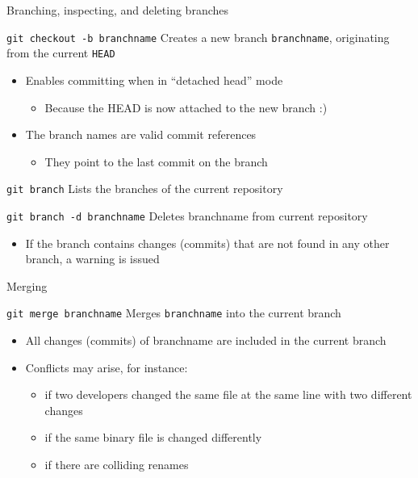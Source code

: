 \documentclass[presentation]{beamer}
\begin{document}
\begin{frame}{Branching, inspecting, and deleting branches}
    \begin{block}{\texttt{git checkout -b branchname}}
        Creates a new branch \texttt{branchname}, originating from the current \texttt{HEAD}
        \begin{itemize}
            \item Enables committing when in ``detached head'' mode
            \begin{itemize}
                \item Because the HEAD is now attached to the new branch :)
            \end{itemize}
            \item The branch names are valid commit references
            \begin{itemize}
                \item They point to the last commit on the branch
            \end{itemize}
        \end{itemize}
    \end{block}
    \begin{block}{\texttt{git branch}}
        Lists the branches of the current repository
    \end{block}
    \begin{block}{\texttt{git branch -d branchname}}
        Deletes branchname from current repository
        \begin{itemize}
            \item If the branch contains changes (commits) that are not found in any other branch, a warning is issued
        \end{itemize}
    \end{block}
\end{frame}

\begin{frame}{Merging}
    \begin{block}{\texttt{git merge branchname}}
        Merges \texttt{branchname} into the current branch
        \begin{itemize}
            \item All changes (commits) of branchname are included in the current branch
            \item Conflicts may arise, for instance:
            \begin{itemize}
                \item if two developers changed the same file at the same line with two different changes
                \item if the same binary file is changed differently
                \item if there are colliding renames
            \end{itemize}
        \end{itemize}
    \end{block}
\end{frame}
\end{document}
